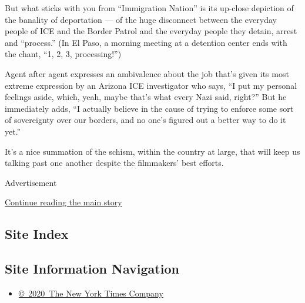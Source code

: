 But what sticks with you from ``Immigration Nation'' is its up-close
depiction of the banality of deportation --- of the huge disconnect
between the everyday people of ICE and the Border Patrol and the
everyday people they detain, arrest and ``process.'' (In El Paso, a
morning meeting at a detention center ends with the chant, ``1, 2, 3,
processing!'')

Agent after agent expresses an ambivalence about the job that's given
its most extreme expression by an Arizona ICE investigator who says, ``I
put my personal feelings aside, which, yeah, maybe that's what every
Nazi said, right?'' But he immediately adds, ``I actually believe in the
cause of trying to enforce some sort of sovereignty over our borders,
and no one's figured out a better way to do it yet.''

It's a nice summation of the schism, within the country at large, that
will keep us talking past one another despite the filmmakers' best
efforts.

Advertisement

\protect\hyperlink{after-bottom}{Continue reading the main story}

\hypertarget{site-index}{%
\subsection{Site Index}\label{site-index}}

\hypertarget{site-information-navigation}{%
\subsection{Site Information
Navigation}\label{site-information-navigation}}

\begin{itemize}
\tightlist
\item
  \href{https://help.nytimes.com/hc/en-us/articles/115014792127-Copyright-notice}{©~2020~The
  New York Times Company}
\end{itemize}

